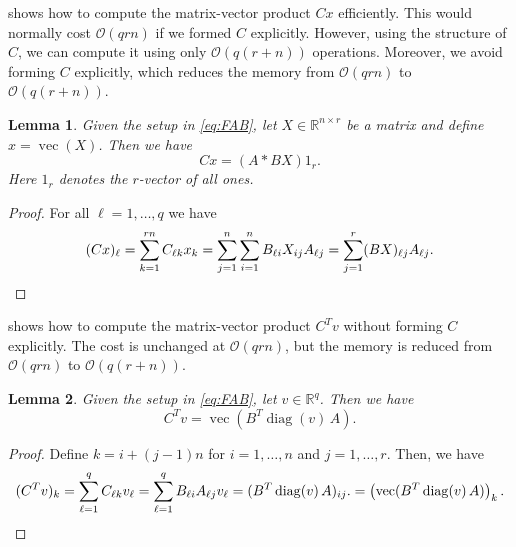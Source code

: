 \documentclass{article}
\DeclareMathOperator{\vecop}{vec}
\DeclareMathOperator{\diag}{diag}
\theoremstyle{plain} %
\newtheorem{lemma}{Lemma}
\begin{document}
 shows how to compute the matrix-vector product $C x$ efficiently.
This would normally cost $\mathcal{O}(q r n)$ if we formed $C$ explicitly.
However, using the structure of $C$, we can compute it using only $\mathcal{O}(q (r + n))$ operations. Moreover, we avoid forming $C$ explicitly, which reduces the memory from $\mathcal{O}(q r n)$ to $\mathcal{O}(q (r + n))$.

\begin{lemma}\label{lem:F}
    Given the setup in \cref{eq:FAB}, let $X \in \mathbb{R}^{n \times r}$ be a matrix and define $x = \vecop(X)$.
    Then we have
    \begin{displaymath}
        C x = ( A \ast B X )  1_r.
    \end{displaymath}
	Here $1_r$ denotes the $r$-vector of all ones.
\end{lemma}
\begin{proof}
    For all $\ell=1,\ldots,q$ we have
    \begin{displaymath}
        (C x)_{\ell} 
        = \sum_{k=1}^{rn} C_{\ell k} x_{k}
        = \sum_{j=1}^n \sum_{i=1}^n B_{\ell i} X_{ij} A_{\ell j}
        = \sum_{j=1}^r (B X)_{\ell j} A_{\ell j}.
		\qedhere
    \end{displaymath}
\end{proof}

 shows how to compute the matrix-vector product $C^T v$ without forming $C$ explicitly. The cost is unchanged at $\mathcal{O}(qrn)$, but the memory is reduced from $\mathcal{O}(q r n)$ to $\mathcal{O}(q (r + n))$.

\begin{lemma}\label{lem:Ft}
    Given the setup in \cref{eq:FAB}, let $v \in \mathbb{R}^{q}$.
    Then we have
    \begin{displaymath}
        C^T v = \vecop( B^T \diag(v) \, A ).
    \end{displaymath}
\end{lemma}

\begin{proof}    
    Define $k = i + (j-1)n$ for $i=1,\ldots,n$ and $j=1,\ldots,r$. Then, we have
    \begin{displaymath}
        (C^T v)_{k} 
        = \sum_{\ell=1}^q C_{\ell k} v_{\ell} 
        = \sum_{\ell=1}^q B_{\ell i} A_{\ell j} v_{\ell} 
        = (B^T \diag(v) \, A)_{ij}.
        = \left( \vecop (B^T \diag(v) \, A) \right)_{k}.        
		\qedhere
    \end{displaymath}
\end{proof}
\end{document}
